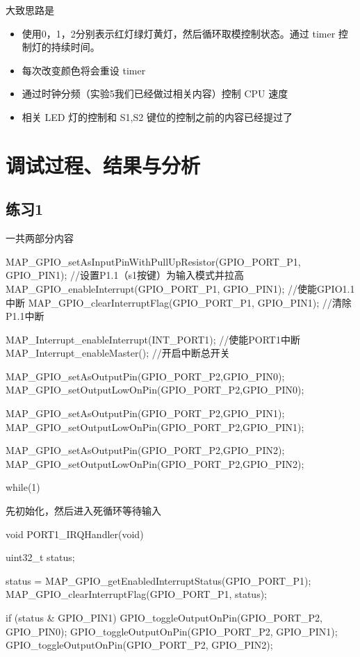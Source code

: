 \documentclass[a4paper,10pt,UTF8]{paper}
\numberwithin{equation}{section}
\numberwithin{figure}{section}
\begin{document}
大致思路是 

\begin{itemize}
  \item 使用0，1，2分别表示红灯绿灯黄灯，然后循环取模控制状态。通过 timer 控制灯的持续时间。
  \item 每次改变颜色将会重设 timer
  \item 通过时钟分频（实验5我们已经做过相关内容）控制 CPU 速度
  \item 相关 LED 灯的控制和 S1,S2 键位的控制之前的内容已经提过了
\end{itemize}

\section{调试过程、结果与分析}

\subsection{练习1}

一共两部分内容

\begin{ccode}
  MAP_GPIO_setAsInputPinWithPullUpResistor(GPIO_PORT_P1, GPIO_PIN1);  
  //设置P1.1（s1按键）为输入模式并拉高  
  MAP_GPIO_enableInterrupt(GPIO_PORT_P1, GPIO_PIN1);  //使能GPIO1.1中断
  MAP_GPIO_clearInterruptFlag(GPIO_PORT_P1, GPIO_PIN1);   //清除P1.1中断 
  
  
  MAP_Interrupt_enableInterrupt(INT_PORT1); //使能PORT1中断
  MAP_Interrupt_enableMaster();  //开启中断总开关  
  
  MAP_GPIO_setAsOutputPin(GPIO_PORT_P2,GPIO_PIN0);
  MAP_GPIO_setOutputLowOnPin(GPIO_PORT_P2,GPIO_PIN0);
  
  MAP_GPIO_setAsOutputPin(GPIO_PORT_P2,GPIO_PIN1);
  MAP_GPIO_setOutputLowOnPin(GPIO_PORT_P2,GPIO_PIN1);
  
  MAP_GPIO_setAsOutputPin(GPIO_PORT_P2,GPIO_PIN2);
  MAP_GPIO_setOutputLowOnPin(GPIO_PORT_P2,GPIO_PIN2);

  while(1){}
\end{ccode}

先初始化，然后进入死循环等待输入

\begin{ccode}
  void PORT1_IRQHandler(void)
  {
    uint32_t status;

    status = MAP_GPIO_getEnabledInterruptStatus(GPIO_PORT_P1);
    MAP_GPIO_clearInterruptFlag(GPIO_PORT_P1, status);

    if (status & GPIO_PIN1) {
      GPIO_toggleOutputOnPin(GPIO_PORT_P2, GPIO_PIN0);
      GPIO_toggleOutputOnPin(GPIO_PORT_P2, GPIO_PIN1);
      GPIO_toggleOutputOnPin(GPIO_PORT_P2, GPIO_PIN2);
    }
  }
\end{ccode}
\end{document}
